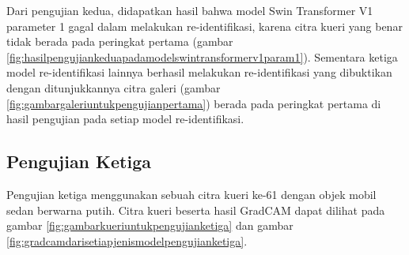 Dari pengujian kedua, didapatkan hasil bahwa model Swin Transformer V1 parameter 1 gagal dalam melakukan re-identifikasi, 
karena citra kueri yang benar tidak berada pada peringkat pertama (gambar 
\ref{fig:hasilpengujiankeduapadamodelswintransformerv1param1}). Sementara ketiga model re-identifikasi lainnya berhasil 
melakukan re-identifikasi yang dibuktikan dengan ditunjukkannya citra galeri (gambar \ref{fig:gambargaleriuntukpengujianpertama})
berada pada peringkat pertama di hasil pengujian pada setiap model re-identifikasi.

\subsection{Pengujian Ketiga}

Pengujian ketiga menggunakan sebuah citra kueri ke-61 dengan objek mobil sedan \linebreak berwarna putih. Citra kueri 
beserta hasil GradCAM dapat dilihat pada gambar \ref{fig:gambarkueriuntukpengujianketiga} dan gambar \ref{fig:gradcamdarisetiapjenismodelpengujianketiga}.

